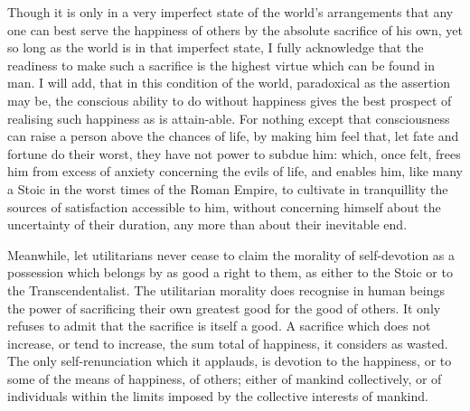Though it is only in a very imperfect state of the world's
arrangements that any one can best serve the happiness of others by
the absolute sacrifice of his own, yet so long as the world is in that
imperfect state, I fully acknowledge that the readiness to make such a
sacrifice is the highest virtue which can be found in man. I will add,
that in this condition of the world, paradoxical as the assertion may
be, the conscious ability to do without happiness gives the best
prospect of realising such happiness as is attain-able. For
nothing except that consciousness can raise a person above the chances
of life, by making him feel that, let fate and fortune do their worst,
they have not power to subdue him: which, once felt, frees him from
excess of anxiety concerning the evils of life, and enables him, like
many a Stoic in the worst times of the Roman Empire, to cultivate in
tranquillity the sources of satisfaction accessible to him, without
concerning himself about the uncertainty of their duration, any more
than about their inevitable end.

Meanwhile, let utilitarians never cease to claim the morality of
self-de\-vo\-tion as a possession which belongs by as good a right to
them, as either to the Stoic or to the Transcendentalist. The
utilitarian morality does recognise in human beings the power of
sacrificing their own greatest good for the good of others. It only
refuses to admit that the sacrifice is itself a good. A sacrifice
which does not increase, or tend to increase, the sum total of
happiness, it considers as wasted. The only self-renunciation which it
applauds, is devotion to the happiness, or to some of the means of
happiness, of others; either of mankind collectively, or of
individuals within the limits imposed by the collective interests of
mankind.

